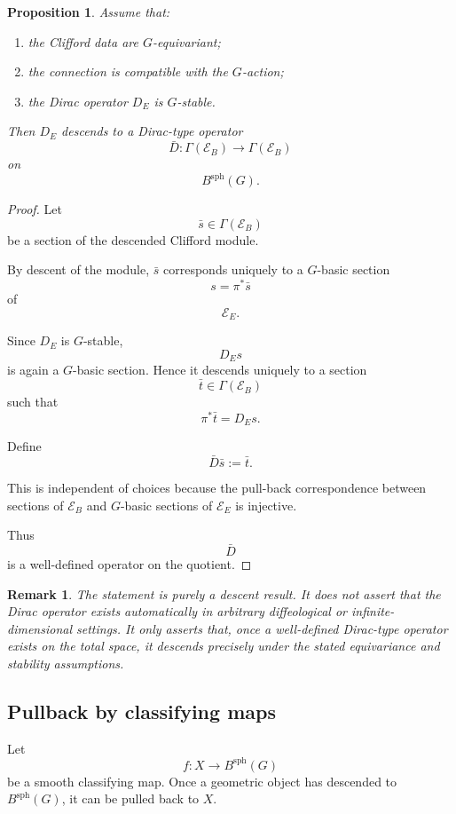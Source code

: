 \documentclass[11pt]{amsart}
\newtheorem{proposition}[definition]{Proposition}
\newtheorem{remark}[definition]{Remark}
\begin{document}
\begin{proposition}
Assume that:
\begin{enumerate}
\item the Clifford data are \(G\)-equivariant;
\item the connection is compatible with the \(G\)-action;
\item the Dirac operator \(D_E\) is \(G\)-stable.
\end{enumerate}

Then \(D_E\) descends to a Dirac-type operator
\[
\bar D:
\Gamma(\mathcal E_B)
\longrightarrow
\Gamma(\mathcal E_B)
\]
on
\[
B^{\mathrm{sph}}(G).
\]
\end{proposition}

\begin{proof}
Let
\[
\bar s\in\Gamma(\mathcal E_B)
\]
be a section of the descended Clifford module.

By descent of the module, \(\bar s\) corresponds uniquely to a \(G\)-basic
section
\[
s=\pi^*\bar s
\]
of
\[
\mathcal E_E.
\]

Since \(D_E\) is \(G\)-stable,
\[
D_Es
\]
is again a \(G\)-basic section. Hence it descends uniquely to a section
\[
\bar t\in\Gamma(\mathcal E_B)
\]
such that
\[
\pi^*\bar t=D_Es.
\]

Define
\[
\bar D\bar s:=\bar t.
\]

This is independent of choices because the pull-back correspondence between
sections of \(\mathcal E_B\) and \(G\)-basic sections of \(\mathcal E_E\) is
injective.

Thus
\[
\bar D
\]
is a well-defined operator on the quotient.
\end{proof}

\begin{remark}
The statement is purely a descent result. It does not assert that the Dirac
operator exists automatically in arbitrary diffeological or
infinite-dimensional settings. It only asserts that, once a well-defined
Dirac-type operator exists on the total space, it descends precisely under
the stated equivariance and stability assumptions.
\end{remark}
\subsection{Pullback by classifying maps}

Let
\[
f:X\longrightarrow B^{\mathrm{sph}}(G)
\]
be a smooth classifying map. Once a geometric object has descended to \(B^{\mathrm{sph}}(G)\), it can be pulled back to \(X\).
\end{document}
